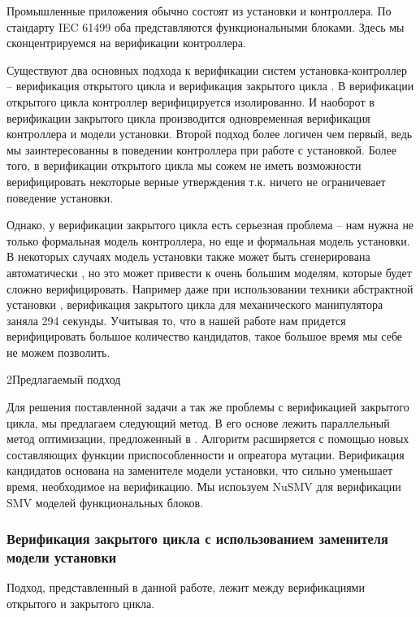 \documentclass[14pt]{extarticle}
\makeatletter
\theoremstyle{plain}
\theoremstyle{definition}
\renewcommand{\subsection}{\@startsection{subsection}{2}{0mm}%
{2\baselineskip}{\baselineskip}{\bfseries\large\itshape}}
\makeatother
\begin{document}
Промышленные приложения обычно состоят из установки и контроллера. По стандарту
IEC 61499 оба представляются функциональными блоками. Здесь мы сконцентрируемся
на верификации контроллера.

Существуют два основных подхода к верификации систем установка-контроллер --
верификация открытого цикла и верификация закрытого цикла \cite{cl}. В верификации
открытого цикла контроллер верифицируется изолированно. И наоборот в
верификации закрытого цикла производится одновременная верификация контроллера
и модели установки. Второй подход более логичен чем первый, ведь мы
заинтересованны в поведении контроллера при работе с установкой. Более того, в
верификации открытого цикла мы сожем не иметь возможности верифицировать
некоторые верные утверждения т.к. ничего не ограничевает поведение установки.

Однако, у верификации закрытого цикла есть серьезная проблема -- нам нужна не
только формальная модель контроллера, но еще и формальная модель установки.
В некоторых случаях модель установки также может быть сгенерирована
автоматически \cite{dd}, но это может привести к очень большим моделям, которые будет
сложно верифицировать. Например даже при использовании техники абстрактной
установки \cite{dd}, верификация закрытого цикла для механического манипулятора заняла
294 секунды. Учитывая то, что в нашей работе нам придется верифицировать
большое количество кандидатов, такое большое время мы себе не можем позволить.

\subsection{Предлагаемый подход}

Для решения поставленной задачи а так же проблемы с верификацией закрытого
цикла, мы предлагаем следующий метод.  В его основе лежить параллельный
метод оптимизации, предложенный в \cite{rec}. Алгоритм расширяется с помощью новых
составляющих функции приспособленности и опреатора мутации. Верификация
кандидатов основана на заменителе модели установки, что сильно уменьшает время,
необходимое на верификацию. Мы испоьзуем NuSMV \cite{nusmv} для верификации SMV моделей
функциональных блоков.

\subsubsection{Верификация закрытого цикла с использованием заменителя модели
установки}

Подход, представленный в данной работе, лежит между верификациями открытого и
закрытого цикла. 
\end{document}
